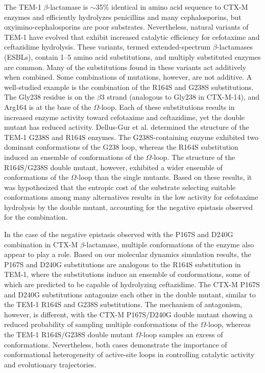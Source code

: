 \documentclass[../main.tex]{subfiles}
\begin{document}
        The TEM-1 $\beta$-lactamase is $\sim$35\% identical in amino acid sequence to CTX-M enzymes and efficiently hydrolyzes penicillins and many cephalosporins, but oxyimino-cephalosporins are poor substrates\cite{palzkill_structural_2018}. Nevertheless, natural variants of TEM-1 have evolved that exhibit increased catalytic efficiency for cefotaxime and ceftazidime hydrolysis\cite{petrosino_-lactamases:_1998,salverda_natural_2010}. These variants, termed extended-spectrum $\beta$-lactamases (ESBLs), contain 1–5 amino acid substitutions, and multiply substituted enzymes are common. Many of the substitutions found in these variants act additively when combined\cite{palzkill_structural_2018}. Some combinations of mutations, however, are not additive. A well-studied example is the combination of the R164S and G238S substitutions. The Gly238 residue is on the $\beta$3 strand (analogous to Gly238 in CTX-M-14), and Arg164 is at the base of the $\Omega$-loop. Each of these substitutions results in increased enzyme activity toward cefotaxime and ceftazidime, yet the double mutant has reduced activity\cite{dellus-gur_negative_2015,giakkoupi_detrimental_2000}. Dellus-Gur et al. \cite{dellus-gur_negative_2015} determined the structure of the TEM-1 G238S and R164S enzymes. The G238S-containing enzyme exhibited two dominant conformations of the G238 loop, whereas the R164S substitution induced an ensemble of conformations of the $\Omega$-loop. The structure of the R164S/G238S double mutant, however, exhibited a wider ensemble of conformations of the $\Omega$-loop than the single mutants\cite{dellus-gur_negative_2015}. Based on these results, it was hypothesized that the entropic cost of the substrate selecting suitable conformations among many alternatives results in the low activity for cefotaxime hydrolysis by the double mutant, accounting for the negative epistasis observed for the combination\cite{dellus-gur_negative_2015}.

        In the case of the negative epistasis observed with the P167S and D240G combination in CTX-M $\beta$-lactamase, multiple conformations of the enzyme also appear to play a role. Based on our molecular dynamics simulation results, the P167S and D240G substitutions are analogous to the R164S substitution in TEM-1, where the substitutions induce an ensemble of conformations, some of which are predicted to be capable of hydrolyzing ceftazidime. The CTX-M P167S and D240G substitutions antagonize each other in the double mutant, similar to the TEM-1 R164S and G238S substitutions. The mechanism of antagonism, however, is different, with the CTX-M P167S/D240G double mutant showing a reduced probability of sampling multiple conformations of the $\Omega$-loop, whereas the TEM-1 R164S/G238S double mutant $\Omega$-loop samples an excess of conformations\cite{dellus-gur_negative_2015}. Nevertheless, both cases demonstrate the importance of conformational heterogeneity of active-site loops in controlling catalytic activity and evolutionary trajectories.
\end{document}
